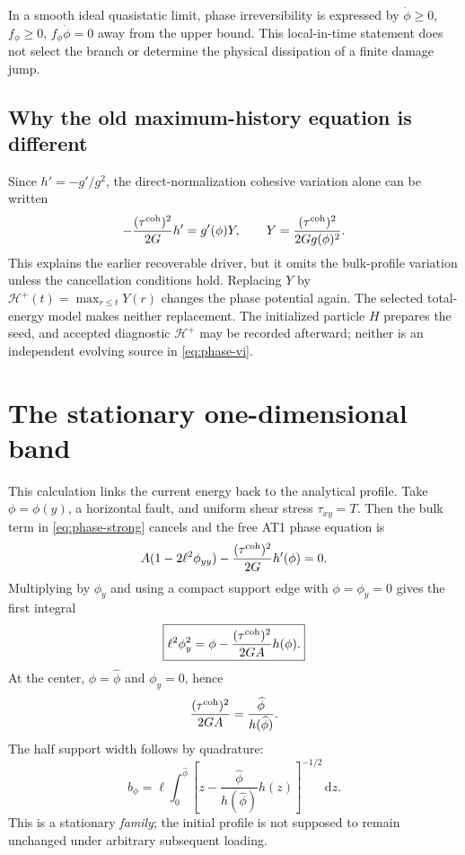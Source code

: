 \documentclass[11pt,a4paper]{article}
\newcommand{\qcoh}{\tau^{\rm coh}}
\newcommand{\dd}{\,\mathrm d}
\begin{document}
In a smooth ideal quasistatic limit, phase irreversibility is expressed by
$\dot\phi\geq0$, $f_\phi\geq0$, $f_\phi\dot\phi=0$ away from the upper bound.
This local-in-time statement does not select the branch or determine the
physical dissipation of a finite damage jump.

\subsection{Why the old maximum-history equation is different}

Since $h'=-g'/g^2$, the direct-normalization cohesive variation alone can be
written
\begin{equation}
 -\frac{(\qcoh)^2}{2G}h'
     =g'(\phi)Y,\qquad
 Y=\frac{(\qcoh)^2}{2Gg(\phi)^2}.
\end{equation}
This explains the earlier recoverable driver, but it omits the bulk-profile
variation unless the cancellation conditions hold. Replacing $Y$ by
$\mathcal H^+(t)=\max_{r\leq t}Y(r)$ changes the phase potential again.
The selected total-energy model makes neither replacement. The initialized
particle $H$ prepares the seed, and accepted diagnostic $\mathcal H^+$ may be
recorded afterward; neither is an independent evolving source in
\cref{eq:phase-vi}.

\section{The stationary one-dimensional band}
\label{sec:stationary}

This calculation links the current energy back to the analytical profile.
Take $\phi=\phi(y)$, a horizontal fault, and uniform shear stress
$\tau_{xy}=T$. Then the bulk term in \cref{eq:phase-strong} cancels and the
free AT1 phase equation is
\begin{equation}
 A(1-2\ell^2\phi_{yy})-\frac{(\qcoh)^2}{2G}h'(\phi)=0.
 \label{eq:stationary-ode}
\end{equation}
Multiplying by $\phi_y$ and using a compact support edge with
$\phi=\phi_y=0$ gives the first integral
\begin{equation}
 \boxed{\ell^2\phi_y^2=\phi-\frac{(\qcoh)^2}{2GA}h(\phi).}
 \label{eq:stationary-first}
\end{equation}
At the center, $\phi=\widehat\phi$ and $\phi_y=0$, hence
\begin{equation}
 \frac{(\qcoh)^2}{2GA}=\frac{\widehat\phi}{h(\widehat\phi)}.
 \label{eq:stationary-core}
\end{equation}
The half support width follows by quadrature:
\begin{equation}
 b_\phi=\ell\int_0^{\widehat\phi}
 \left[z-\frac{\widehat\phi}{h(\widehat\phi)}h(z)\right]^{-1/2}\dd z.
\end{equation}
This is a stationary \emph{family}; the initial profile is not supposed to
remain unchanged under arbitrary subsequent loading.
\end{document}
